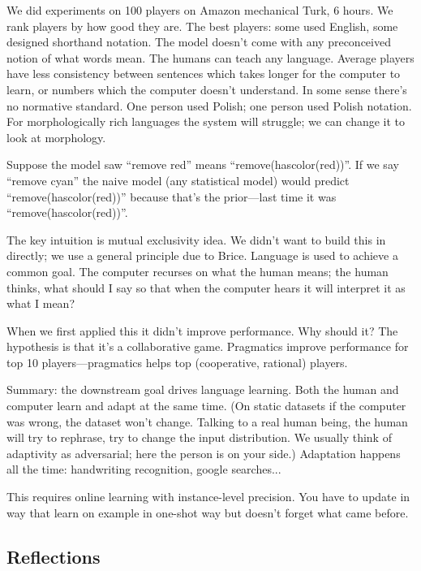 We did experiments on 100 players on Amazon mechanical Turk, 6 hours. We rank players by how good they are. The best players: some used English, some designed shorthand notation. The model doesn't come with any preconceived notion of what words mean. The humans can teach any language. Average players have less consistency between sentences which takes longer for the computer to learn, or numbers which the computer doesn't understand.
In some sense there's no normative standard.
One person used Polish; one person used Polish notation.
For morphologically rich languages the system will struggle; we can change it to look at morphology.

Suppose the model saw ``remove red'' means ``remove(hascolor(red))''. If we say ``remove cyan'' the naive model (any statistical model) would predict ``remove(hascolor(red))'' because that's the prior---last time it was ``remove(hascolor(red))''.

The key intuition is mutual exclusivity idea. We didn't want to build this in directly; we use a general principle due to Brice. Language is used to achieve a common goal. The computer recurses on what the human means; the human thinks, what should I say so that when the computer hears it will interpret it as what I mean? 

When we first applied this it didn't improve performance. Why should it? The hypothesis is that it's a collaborative game.  Pragmatics improve performance for top 10 players---pragmatics helps top (cooperative, rational) players. 

Summary: the downstream goal drives language learning.
Both the human and computer learn and adapt at the same time. (On static datasets if the computer was wrong, the dataset won't change. Talking to a real human being, the human will try to rephrase, try to change the input distribution. We usually think of adaptivity as adversarial; here the person is on your side.) Adaptation happens all the time: handwriting recognition, google searches... 

This requires online learning with instance-level precision. You have to update in way that learn on example in one-shot way but doesn't forget what came before.

	\subsection{Reflections}


